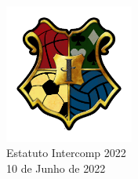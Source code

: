 \begin{center}

	\vspace*{\fill}
	{\let\clearpage\relax \includegraphics[width=120pt]{../logo-inter019.png} \\ [.5cm]}
	\Huge{Estatuto Intercomp 2022} \\ [.5cm]
	\normalsize{10 de Junho de 2022}
	\vspace*{\fill}

\end{center}
